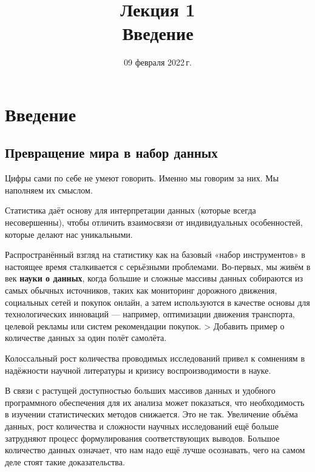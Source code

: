 \documentclass[11pt,a4paper]{article}
\title{
      {\Large Лекция 1} \\
      Введение
    }
\date{09 февраля 2022\,г.}
\begin{document}
    
  \maketitle
  \thispagestyle{empty}
  \tableofcontents
  \pagebreak


    \hypertarget{ux432ux432ux435ux434ux435ux43dux438ux435}{%
\section{Введение}\label{ux432ux432ux435ux434ux435ux43dux438ux435}}

\hypertarget{ux43fux440ux435ux432ux440ux430ux449ux435ux43dux438ux435-ux43cux438ux440ux430-ux432-ux43dux430ux431ux43eux440-ux434ux430ux43dux43dux44bux445}{%
\subsection{Превращение мира в набор
данных}\label{ux43fux440ux435ux432ux440ux430ux449ux435ux43dux438ux435-ux43cux438ux440ux430-ux432-ux43dux430ux431ux43eux440-ux434ux430ux43dux43dux44bux445}}

Цифры сами по себе не умеют говорить. Именно мы говорим за них. Мы
наполняем их смыслом.

Статистика даёт основу для интерпретации данных (которые всегда
несовершенны), чтобы отличить взаимосвязи от индивидуальных
особенностей, которые делают нас уникальными.

Распространённый взгляд на статистику как на базовый «набор
инструментов» в настоящее время сталкивается с серьёзными проблемами.
Во-первых, мы живём в век \textbf{науки о данных}, когда большие и
сложные массивы данных собираются из самых обычных источников, таких как
мониторинг дорожного движения, социальных сетей и покупок онлайн, а
затем используются в качестве основы для технологических инноваций ---
например, оптимизации движения транспорта, целевой рекламы или систем
рекомендации покупок. \textgreater{} Добавить пример о количестве данных
за один полёт самолёта.

Колоссальный рост количества проводимых исследований привел к сомнениям
в надёжности научной литературы и кризису воспроизводимости в науке.

В связи с растущей доступностью больших массивов данных и удобного
программного обеспечения для их анализа может показаться, что
необходимость в изучении статистических методов снижается. Это не так.
Увеличение объёма данных, рост количества и сложности научных
исследований ещё больше затрудняют процесс формулирования
соответствующих выводов. Большое количество данных означает, что нам
надо ещё лучше осознавать, чего на самом деле стоят такие
доказательства.
\end{document}
